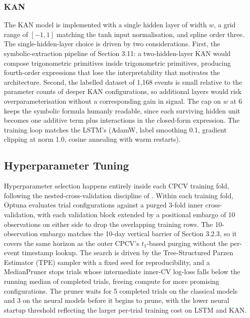 \subsubsection{KAN}\label{subsubsec:kan_model}

The KAN model \citep{liu_kan_2024} is implemented with a single hidden layer of width $w$, a grid range of $[-1, 1]$ matching the tanh input normalisation, and spline order three. The single-hidden-layer choice is driven by two considerations. First, the symbolic-extraction pipeline of Section 3.11: a two-hidden-layer KAN would compose trigonometric primitives inside trigonometric primitives, producing fourth-order expressions that lose the interpretability that motivates the architecture. Second, the labelled dataset of 1,168 events is small relative to the parameter counts of deeper KAN configurations, so additional layers would risk overparameterisation without a corresponding gain in signal. The cap on $w$ at 6 keeps the symbolic formula humanly readable, since each surviving hidden unit becomes one additive term plus interactions in the closed-form expression. The training loop matches the LSTM's (AdamW, label smoothing 0.1, gradient clipping at norm 1.0, cosine annealing with warm restarts).


\subsection{Hyperparameter Tuning}\label{subsec:tuning}

Hyperparameter selection happens entirely inside each CPCV training fold, following the nested-cross-validation discipline of \citet[Chapter 7]{lopez_de_prado_2018}. Within each training fold, Optuna evaluates trial configurations against a purged 3-fold inner cross-validation, with each validation block extended by a positional embargo of 10 observations on either side to drop the overlapping training rows. The 10-observation embargo matches the 10-day vertical barrier of Section 3.2.3, so it covers the same horizon as the outer CPCV's $t_1$-based purging without the per-event timestamp lookup. The search is driven by the Tree-Structured Parzen Estimator (TPE) sampler \citep{akiba_optuna_2019} with a fixed seed for reproducibility, and a MedianPruner stops trials whose intermediate inner-CV log-loss falls below the running median of completed trials, freeing compute for more promising configurations. The pruner waits for 5 completed trials on the classical models and 3 on the neural models before it begins to prune, with the lower neural startup threshold reflecting the larger per-trial training cost on LSTM and KAN.

